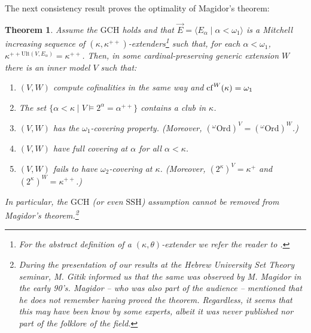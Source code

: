 \documentclass[11pt]{amsart}
\newtheorem{theorem}{Theorem}[section]
\theoremstyle{definition}
\theoremstyle{remark}
\newcommand{\cf}{{\rm cf}}
\def\s{\subseteq}
\newcommand\tom[1]{\marginpar{Tom: #1}}
\newcommand\ale[1]{\marginpar{Alejandro: #1}}
\begin{document}
The next consistency result proves the optimality of Magidor's theorem:
\begin{theorem}\label{thm:optimality of Magidor}
    Assume the $\mathrm{GCH}$ holds and that $\vec{E}=\langle E_\alpha\mid \alpha<\omega_1\rangle$ is a Mitchell increasing sequence of $(\kappa,\kappa^{++})$-extenders\footnote{For the abstract definition of a $(\kappa,\theta)$-extender we refer the reader to \cite[\S26]{Kan}.} %
    such that, for each $\alpha <\omega_1$, $\kappa^{++\mathrm{Ult}(V,E_\alpha)}=\kappa^{++}$. Then, in some cardinal-preserving generic extension $W$ there is an inner model $V$ such that:
    \begin{enumerate}
         \item $(V,W)$ compute cofinalities in the same way and $\cf^{W}(\kappa)=\omega_1$
        \item The set $\{\alpha <\kappa\mid V\models 2^\alpha=\alpha^{++}\}$ contains a club in $\kappa$.
        \item $(V,W)$ has the $\omega_1$-covering property. (Moreover, $({}^\omega \mathrm{Ord})^V=({}^\omega\mathrm{Ord})^W$.)
        \item $(V,W)$ have full covering at $\alpha$ for all $\alpha <\kappa$.
        \item $(V,W)$  fails to have $\omega_2$-covering at $\kappa$. (Moreover, $(2^\kappa)^V=\kappa^+$ and $(2^\kappa)^W=\kappa^{++}$.)
    \end{enumerate}
    In particular, the $\mathrm{GCH}$ (or even $\mathrm{SSH}$) assumption cannot be removed from Magidor's theorem.\footnote{During the presentation of our results at the Hebrew University Set Theory seminar, M. Gitik informed us that the same was observed by  M. Magidor in the early 90's.  Magidor -- who was also part of the audience -- mentioned that he does not remember having proved the theorem.  Regardless, it seems that this may have been know by some experts, albeit it was never published nor  part of the folklore of the field.}
\end{theorem}
\end{document}
